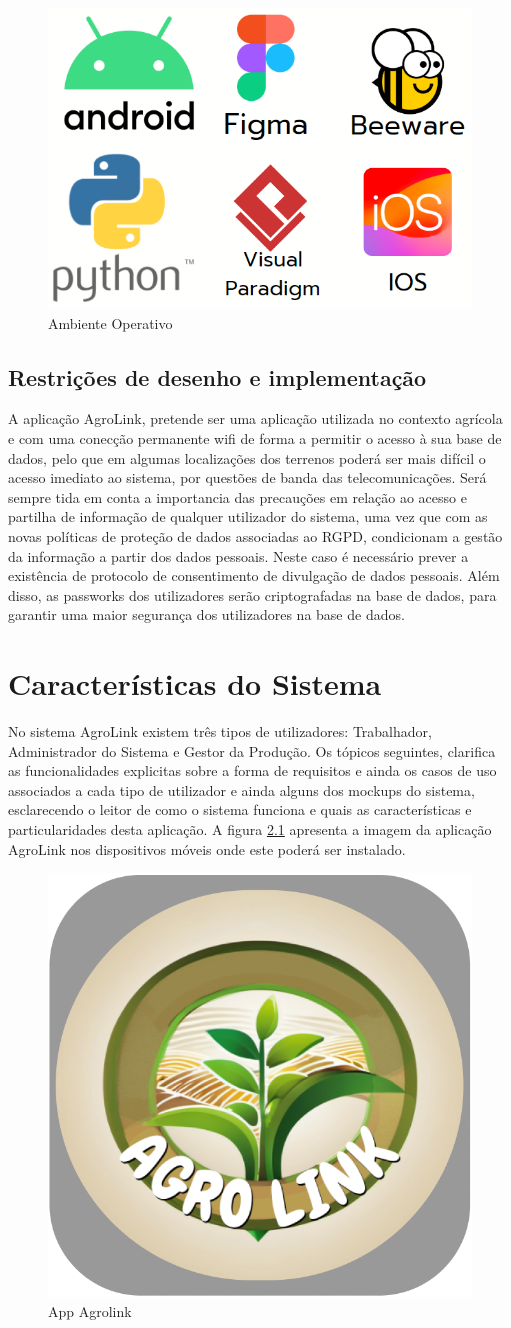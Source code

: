 \documentclass{scrreprt}
\begin{document}
	
	\begin{figure}[!h]
		\centering
		\includegraphics[width=0.3\linewidth]{AmbienteOperativo.png}
		\caption{Ambiente Operativo}
		\label{fig:ambienteoperativo}
	\end{figure}

	\section{Restrições de desenho e implementação}
	A aplicação AgroLink, pretende ser uma aplicação utilizada no contexto agrícola e com uma conecção permanente wifi de forma a permitir o acesso à sua base de dados, pelo que em algumas localizações dos terrenos poderá ser mais difícil o acesso imediato ao sistema, por questões de banda das telecomunicações.
	Será sempre tida em conta a importancia das precauções em relação ao 
	acesso e partilha de informação de qualquer utilizador do sistema, uma vez que com as novas políticas de proteção de dados associadas ao RGPD, condicionam a gestão da informação a partir dos dados pessoais. Neste caso é necessário prever a existência de protocolo de consentimento de divulgação de dados pessoais.
	Além disso, as passworks dos utilizadores serão criptografadas na base de dados, para garantir uma maior segurança dos utilizadores na base de dados.
		
		
		\chapter{ Características do Sistema}
	No sistema AgroLink existem três tipos de utilizadores: Trabalhador, Administrador do Sistema e Gestor da Produção.
	Os tópicos seguintes, clarifica as funcionalidades explicitas sobre a forma de 
	requisitos e ainda os casos de uso associados a cada tipo de utilizador e ainda alguns dos mockups do sistema, esclarecendo o leitor de como o sistema funciona e quais as características e particularidades desta aplicação. 
	A figura \ref{fig:appagrolink} apresenta a imagem da aplicação AgroLink nos dispositivos móveis onde este poderá ser instalado.
	
	\begin{figure}[h!]
		\centering
		\includegraphics[width=0.2\linewidth]{AppAgrolink}
		\caption{App Agrolink}
		\label{fig:appagrolink}
	\end{figure}
	
\end{document}

